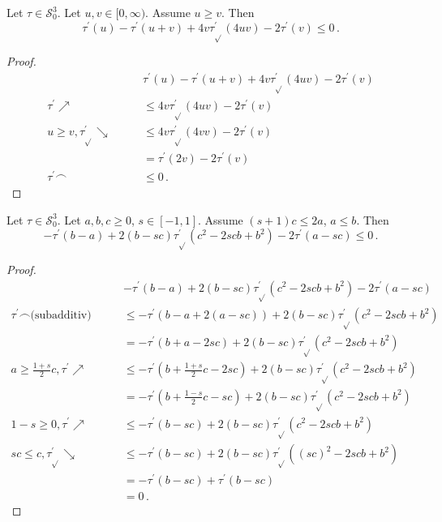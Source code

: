 \documentclass{article}
\newcommand*{\mc}[1]{\mathcal{#1}}
\newcommand{\Rp}{[0, \infty)} %
\newcommand{\pr}{^\prime}
\newcommand{\equationFullstop}{\, .}
\newcommand{\eqfs}{\equationFullstop}
\newcommand{\tran}{\tau}
\newcommand{\trans}{\tran_{\!\sqrt{}}}
\newcommand{\dtrans}{\trans\pr}
\newcommand{\dtran}{\tran\pr}
\newcommand{\setccod}[1]{\mc S_0^{#1}}
\newcommand{\incr}{\nearrow}
\newcommand{\decr}{\searrow}
\newcommand{\conc}{\smallfrown}
\begin{document}
\begin{appendix}
\begin{lemma}
	Let $\tran\in\setccod3$.
	Let $u,v\in\Rp$.
	Assume $u \geq v$.
	Then
	\begin{equation*}
		\dtran(u)-\dtran(u+v)+4v\dtrans(4uv) - 2\dtran(v) \leq 0
		\eqfs
	\end{equation*}
\end{lemma}
%
\begin{proof}
	\begin{align*}
		&
		\dtran(u)-\dtran(u+v)+4v\dtrans(4uv) - 2\dtran(v)
		\\
		\dtran\incr
		\qquad&\leq
		4v\dtrans(4uv) - 2\dtran(v)
		\\
		u\geq v, \dtrans\decr
		\qquad&\leq
		4v\dtrans(4vv) - 2\dtran(v)
		\\
		\qquad&=
		\dtran(2v) - 2\dtran(v)
		\\
		\dtran\conc
		\qquad&\leq
		0
		\eqfs
	\end{align*} 
\end{proof}
%
%
%
\begin{lemma}\label{mech:6}
	Let $\tran\in\setccod3$.
	Let $a,b,c\geq0$, $s\in[-1,1]$.
	Assume $(s+1)c\leq 2a$, $a \leq b$.
	Then
	\begin{equation*}
		-\dtran(b-a)+2(b-sc)\dtrans(c^2-2scb+b^2) - 2\dtran(a - sc)
		\leq
		0
		\eqfs
	\end{equation*}
\end{lemma}
%
\begin{proof}
	\begin{align*}
		&
		-\dtran(b-a)+2(b-sc)\dtrans(c^2-2scb+b^2) - 2\dtran(a - sc)
		\\
		\dtran\conc \text{(subadditiv)}
		\qquad&\leq
		-\dtran(b-a + 2(a - sc))+2(b-sc)\dtrans(c^2-2scb+b^2)
		\\
		\qquad&=
		-\dtran(b+a-2sc) + 2(b-sc)\dtrans(c^2-2scb+b^2)
		\\
		a \geq \frac{1+s}{2}c,\dtran\incr
		\qquad&\leq
		-\dtran(b+\frac{1+s}{2}c-2sc) + 2(b-sc)\dtrans(c^2-2scb+b^2)
		\\
		\qquad&=
		-\dtran(b+\frac{1-s}{2}c-sc) + 2(b-sc)\dtrans(c^2-2scb+b^2)
		\\
		1-s \geq 0,\dtran\incr
		\qquad&\leq
		-\dtran(b-sc) + 2(b-sc)\dtrans(c^2-2scb+b^2)
		\\
		sc \leq c,\dtrans\decr
		\qquad&\leq
		-\dtran(b-sc) + 2(b-sc)\dtrans((sc)^2-2scb+b^2)
		\\
		\qquad&=
		-\dtran(b-sc) + \dtran(b-sc)
		\\
		\qquad&=
		0
		\eqfs
	\end{align*}
\end{proof}

\end{appendix}
\end{document}
